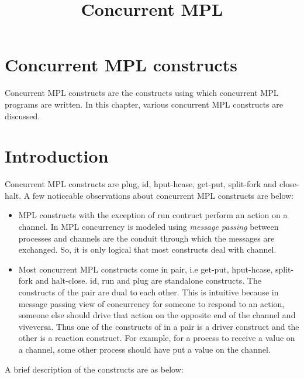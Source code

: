 \documentclass[11pt]{article}
\title{Concurrent MPL}
\newcommand{\<}{\langle}
\renewcommand{\>}{\rangle}
\begin{document}
\maketitle

\section {Concurrent MPL constructs}
Concurrent MPL constructs are the constructs using which concurrent MPL programs are written. In this chapter, various concurrent MPL constructs are discussed.

\section {Introduction}
Concurrent MPL constructs are {\sf plug}, {\sf id}, {\sf hput-hcase}, {\sf get-put}, {\sf split-fork} and {\sf close-halt}. A few noticeable observations about concurrent MPL constructs are below:
\begin{itemize}
  \item MPL constructs with the exception of {\sf run} contruct perform an action on a channel. In MPL concurrency is modeled using {\em message passing} between processes and channels are the conduit through which the messages are exchanged. So, it is only logical that most constructs deal with channel.
  \item Most concurrent MPL constructs come in pair, i.e {\sf get-put}, {\sf hput-hcase}, {\sf split-fork} and {\sf halt-close}. {\sf id}, {\sf run} and {\sf plug} are standalone constructs. The constructs of the pair are dual to each other.
  This is intuitive because in message passing view of concurrency for someone to respond to an action, someone else should drive that action on the opposite end of the channel and viveversa. Thus one of the constructs of in a pair is a driver construct and the other is a reaction construct. For example, for a process to receive a value on a channel, some other process should have put a value on the channel.
\end{itemize}

A brief description of the constructs are as below:
\end{document}
